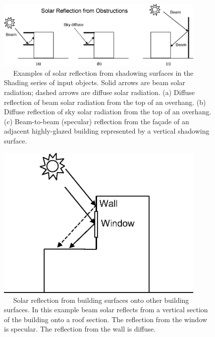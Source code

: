 \begin{figure}[hbtp] %
\centering
\includegraphics[width=0.9\textwidth, height=0.9\textheight, keepaspectratio=true]{media/image670.png}
\caption{   Examples of solar reflection from shadowing surfaces in the Shading series of input objects. Solid arrows are beam solar radiation; dashed arrows are diffuse solar radiation. (a) Diffuse reflection of beam solar radiation from the top of an overhang. (b) Diffuse reflection of sky solar radiation from the top of an overhang. (c) Beam-to-beam (specular) reflection from the façade of an adjacent highly-glazed building represented by a vertical shadowing surface. \protect \label{fig:examples-of-solar-reflection-from-shadowing}}
\end{figure}

\begin{figure}[hbtp] %
\centering
\includegraphics[width=0.9\textwidth, height=0.9\textheight, keepaspectratio=true]{media/image671.png}
\caption{   Solar reflection from building surfaces onto other building surfaces. In this example beam solar reflects from a vertical section of the building onto a roof section. The reflection from the window is specular. The reflection from the wall is diffuse. \protect \label{fig:solar-reflection-from-building-surfaces-onto}}
\end{figure}

